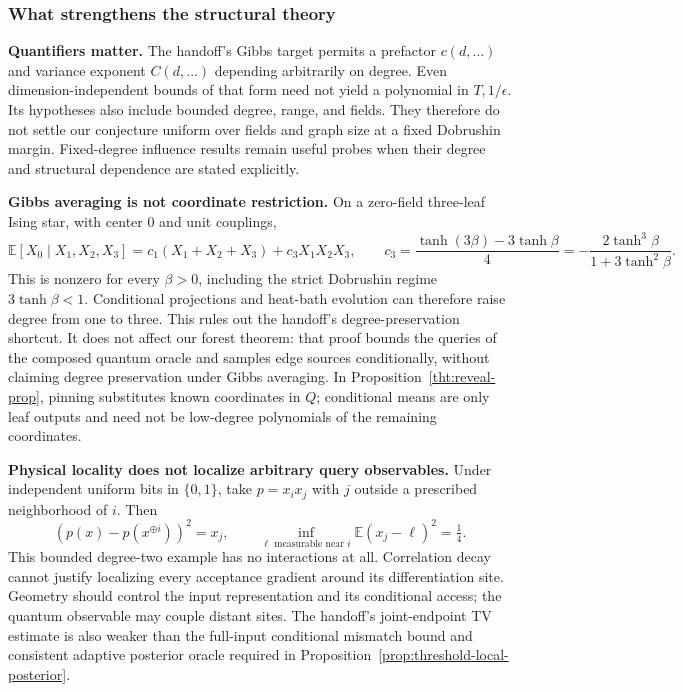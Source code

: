 \subsubsection{What strengthens the structural theory}

\textbf{Quantifiers matter.} The handoff's Gibbs target permits a
prefactor $c(d,\ldots)$ and variance exponent $C(d,\ldots)$ depending
arbitrarily on degree. Even dimension-independent bounds of that form
need not yield a polynomial in $T,1/\epsilon$. Its hypotheses also
include bounded degree, range, and fields. They therefore do not settle
our conjecture uniform over fields and graph size at a fixed Dobrushin
margin. Fixed-degree influence results remain useful probes when their
degree and structural dependence are stated explicitly.

\textbf{Gibbs averaging is not coordinate restriction.} On a zero-field
three-leaf Ising star, with center 0 and unit couplings,
\[
 \mathbb E[X_0\mid X_1,X_2,X_3]
 =c_1(X_1+X_2+X_3)+c_3X_1X_2X_3,
 \qquad
 c_3=\frac{\tanh(3\beta)-3\tanh\beta}{4}
     =-\frac{2\tanh^3\beta}{1+3\tanh^2\beta}.
\]
This is nonzero for every $\beta>0$, including the strict Dobrushin
regime $3\tanh\beta<1$. Conditional projections and heat-bath
evolution can therefore raise degree from one to three. This rules out
the handoff's degree-preservation shortcut. It does not affect our
forest theorem: that proof bounds the queries of the composed quantum
oracle and samples edge sources conditionally, without claiming degree
preservation under Gibbs averaging. In
Proposition~\ref{tht:reveal-prop}, pinning substitutes known coordinates
in $Q$; conditional means are only leaf outputs and need not be
low-degree polynomials of the remaining coordinates.

\textbf{Physical locality does not localize arbitrary query observables.}
Under independent uniform bits in $\{0,1\}$, take $p=x_ix_j$ with $j$
outside a prescribed neighborhood of $i$. Then
\[
 (p(x)-p(x^{\oplus i}))^2=x_j,
 \qquad
 \inf_{\ell\text{ measurable near }i}\mathbb E(x_j-\ell)^2=\tfrac14.
\]
This bounded degree-two example has no interactions at all. Correlation
decay cannot justify localizing every acceptance gradient around its
differentiation site. Geometry should control the input representation
and its conditional access; the quantum observable may couple distant
sites. The handoff's joint-endpoint TV estimate is also weaker than
the full-input conditional mismatch bound and consistent adaptive
posterior oracle required in
Proposition~\ref{prop:threshold-local-posterior}.
